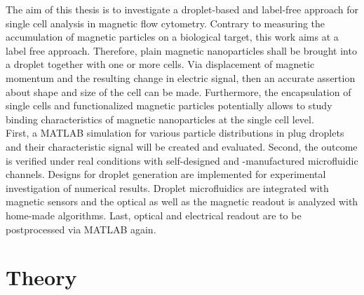 The aim of this thesis is to investigate a droplet-based and label-free approach for single cell analysis in magnetic flow cytometry. Contrary to measuring the accumulation of magnetic particles on a biological target, this work aims at a label free approach. Therefore, plain magnetic nanoparticles shall be brought into a droplet together with one or more cells. Via displacement of magnetic momentum and the resulting change in electric signal, then an accurate assertion about shape and size of the cell can be made. Furthermore, the encapsulation of single cells and functionalized magnetic particles potentially allows to study binding characteristics of magnetic nanoparticles at the single cell level. \\First, a MATLAB simulation for various particle distributions in plug droplets and their characteristic signal will be created and evaluated. Second, the outcome is verified under real conditions with self-designed and -manufactured microfluidic channels. Designs for droplet generation are implemented for experimental investigation of numerical results. Droplet microfluidics are integrated with magnetic sensors and the optical as well as the magnetic readout is analyzed with home-made algorithms. Last, optical and electrical readout are to be postprocessed via MATLAB again.
\newpage\null\thispagestyle{empty}\newpage

\chapter{Theory}

